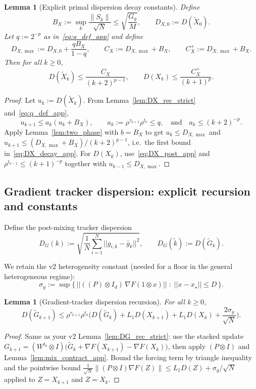 \documentclass[11pt,a4paper]{article}
\def\one{1}%
\def\J{J}%
\def\Pmat{P}%
\def\norm#1{||#1||}%
\newtheorem{lemma}[theorem]{Lemma}
\newcommand{\one}{\mathbf{1}}
\newcommand{\norm}[1]{\left\|#1\right\|}
\newcommand{\J}{\left(\frac{1}{N}\one\one^\top\right)}
\newcommand{\Pmat}{I-\J}
\begin{document}
\begin{lemma}[Explicit primal dispersion decay constants]\label{lem:DX_decay_constants}
	Define
	\[
	B_X:=\sup_k \frac{\|S_k\|}{\sqrt N}\le \sqrt{\frac{G_g}{M}},
	\qquad
	D_{X,0}:=D(\tilde X_0).
	\]
	Let $q:=2^{-p}$ as in~\eqref{eq:q_def_app} and define
	\[
	D_{X,\max}:=D_{X,0}+\frac{qB_X}{1-q},
	\qquad
	C_X:=D_{X,\max}+B_X,
	\qquad
	C_X^{+}:=D_{X,\max}+B_X.
	\]
	Then for all $k\ge 0$,
	\begin{equation}\label{eq:DX_decay_app}
		D(\tilde X_k)\le \frac{C_X}{(k+2)^{p-1}},
		\qquad
		D(X_k)\le \frac{C_X^{+}}{(k+1)^{p}}.
	\end{equation}
\end{lemma}
\begin{proof}
	Let $u_k:=D(\tilde X_k)$. From Lemma~\ref{lem:DX_rec_strict} and~\eqref{eq:q_def_app},
	\[
	u_{k+1}\le a_k(u_k+B_X),\qquad a_k:=\rho^{\tau_{k+1}}\rho^{t_k}\le q,
	\quad\text{and}\quad a_k\le (k+2)^{-p}.
	\]
	Apply Lemma~\ref{lem:two_phase} with $b=B_X$ to get $u_k\le D_{X,\max}$ and
	$u_{k+1}\le (D_{X,\max}+B_X)/(k+2)^{p-1}$, i.e.\ the first bound in~\eqref{eq:DX_decay_app}.
	For $D(X_k)$, use~\eqref{eq:DX_post_app} and $\rho^{t_{k-1}}\le (k+1)^{-p}$ together with $u_{k-1}\le D_{X,\max}$.
\end{proof}

\subsection{Gradient tracker dispersion: explicit recursion and constants}

Define the post-mixing tracker dispersion
\[
D_G(k):=\sqrt{\frac1N\sum_{i=1}^N\norm{g_{i,k}-\bar g_k}^2},
\qquad
D_G(\tilde k):=D(\tilde G_k).
\]

We retain the v2 heterogeneity constant (needed for a floor in the general heterogeneous regime):
\[
\sigma_g := \sup\Big\{\, \norm{((\Pmat)\otimes I_d)\,\nabla F(\one\otimes x)}\;:\; \norm{x-x_\star}\le D\,\Big\}.
\]

\begin{lemma}[Gradient-tracker dispersion recursion]\label{lem:DG_rec_strict_app}
	For all $k\ge 0$,
	\begin{equation}\label{eq:DG_rec_strict_app}
		D(\tilde G_{k+1})
		\le \rho^{\tau_{k+1}}\rho^{t_k}\Big(D(\tilde G_k)+L_1 D(X_{k+1})+L_1 D(X_k)+\frac{2\sigma_g}{\sqrt N}\Big).
	\end{equation}
\end{lemma}
\begin{proof}
	Same as your v2 Lemma~\ref{lem:DG_rec_strict}:
	use the stacked update
	$G_{k+1}=(W^{t_k}\otimes I)\big(\tilde G_k+\nabla F(X_{k+1})-\nabla F(X_k)\big)$,
	then apply $(\Pmat\otimes I)$ and Lemma~\ref{lem:mix_contract_app}.
	Bound the forcing term by triangle inequality and the pointwise bound
	$\frac{1}{\sqrt N}\|(\Pmat\otimes I)\nabla F(Z)\|\le L_1D(Z)+\sigma_g/\sqrt N$
	applied to $Z=X_{k+1}$ and $Z=X_k$.
\end{proof}
\end{document}
